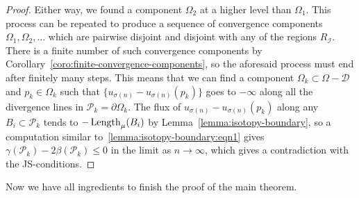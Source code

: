 \documentclass[a4paper,10pt,reqno]{amsart}
\newcommand{\Length}{\mathop{\rm Length}\nolimits}
\newcommand{\sm}{-}
\theoremstyle{definition}
\theoremstyle{remark}
\numberwithin{equation}{section}
\begin{document}
\begin{proof}
Either way, we found a component $\Omega_2$ at a higher level than $\Omega_1$. This process can be repeated to produce a sequence of convergence components $\Omega_1,\Omega_2,\ldots$ which are pairwise disjoint and disjoint with any of the regions $R_{\mathcal I}$. There is a finite number of such convergence components by Corollary~\ref{coro:finite-convergence-components}, so the aforesaid process must end after finitely many steps. This means that we can find a component $\Omega_k\subset\Omega\sm\mathcal D$ and $p_k\in\Omega_k$ such that $\{u_{\sigma(n)}-u_{\sigma(n)}(p_k)\}$ goes to $-\infty$ along all the divergence lines in $\mathcal P_k=\partial\Omega_k$. The flux of $u_{\sigma(n)}-u_{\sigma(n)}(p_k)$ along any $B_i\subset\mathcal P_k$ tends to $-\Length_\mu(B_i)$ by Lemma~\ref{lemma:isotopy-boundary}, so a computation similar to~\eqref{lemma:isotopy-boundary:eqn1} gives $\gamma(\mathcal P_k)-2\beta(\mathcal P_k)\leq 0$ in the limit as $n\to\infty$, which gives a contradiction with the JS-conditions.
\end{proof}

Now we have all ingredients to finish the proof of the main theorem.
\end{document}
